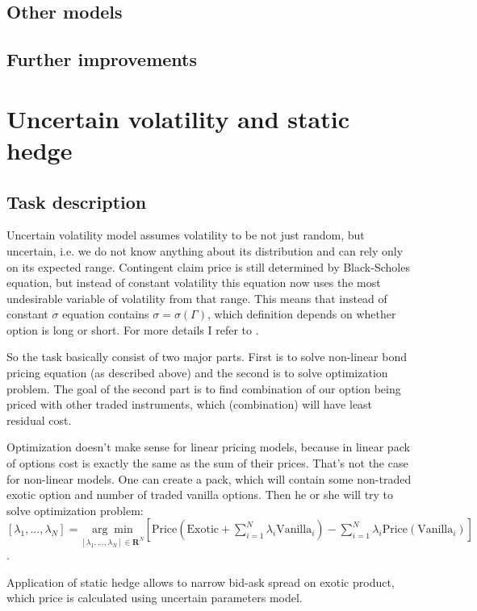 \documentclass[11pt]{article} %
\begin{document}
\subsection{Other models}

\subsection{Further improvements}


\section{Uncertain volatility and static hedge}
\subsection{Task description}
Uncertain volatility model assumes volatility to be not just random, but uncertain, i.e. we do not know anything about its distribution and can rely only on its expected range. Contingent claim price is still determined by Black-Scholes equation, but instead of constant volatility this equation now uses the most undesirable variable of volatility from that range. This means that instead of constant $\sigma$ equation contains $\sigma = \sigma(\Gamma)$, which definition depends on whether option is long or short. For more details I refer to \cite[ch. 52 and 60]{PWoQF06}.

So the task basically consist of two major parts. First is to solve non-linear bond pricing equation (as described above) and the second is to solve optimization problem. The goal of the second part is to find combination of our option being priced with other traded instruments, which (combination) will have least residual cost. 

Optimization doesn't make sense for linear pricing models, because in linear pack of options cost is exactly the same as the sum of their prices. That's not the case for non-linear models. One can create a pack, which will contain some non-traded exotic option and number of traded vanilla options. Then he or she will try to solve optimization problem: $[\lambda_1, ..., \lambda_N] = \underset{[\lambda_1, ..., \lambda_N]\in \mathbf{R}^N}{\arg \min} \left[\text{Price}\left(\text{Exotic} + \sum_{i=1}^{N}\lambda_i \text{Vanilla}_i\right) - \sum_{i=1}^N\lambda_i\text{Price}\left(\text{Vanilla}_i\right) \right]$.

Application of static hedge allows to narrow bid-ask spread on exotic product, which price is calculated using uncertain parameters model.
\end{document}
